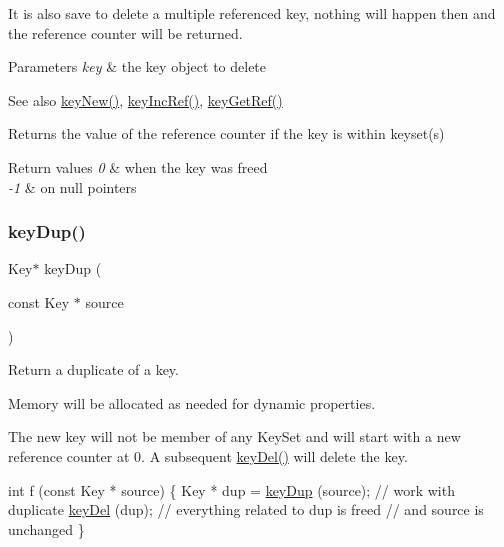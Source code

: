 It is also save to delete a multiple referenced key, nothing will happen then and the reference counter will be returned.


\begin{DoxyParams}{Parameters}
{\em key} & the key object to delete \\
\hline
\end{DoxyParams}
\begin{DoxySeeAlso}{See also}
\hyperlink{group__key_gad23c65b44bf48d773759e1f9a4d43b89}{key\+New()}, \hyperlink{group__key_ga6970a6f254d67af7e39f8e469bb162f1}{key\+Inc\+Ref()}, \hyperlink{group__key_ga4aabc4272506dd63161db2bbb42de8ae}{key\+Get\+Ref()} 
\end{DoxySeeAlso}
\begin{DoxyReturn}{Returns}
the value of the reference counter if the key is within keyset(s) 
\end{DoxyReturn}

\begin{DoxyRetVals}{Return values}
{\em 0} & when the key was freed \\
\hline
{\em -\/1} & on null pointers \\
\hline
\end{DoxyRetVals}
\mbox{\label{group__key_gae6ec6a60cc4b8c1463fa08623d056ce3}} 
\subsubsection{\texorpdfstring{key\+Dup()}{keyDup()}}
{\footnotesize\ttfamily Key$\ast$ key\+Dup (\begin{DoxyParamCaption}\item[{const Key $\ast$}]{source }\end{DoxyParamCaption})}



Return a duplicate of a key. 

Memory will be allocated as needed for dynamic properties.

The new key will not be member of any Key\+Set and will start with a new reference counter at 0. A subsequent \hyperlink{group__key_ga3df95bbc2494e3e6703ece5639be5bb1}{key\+Del()} will delete the key.


\begin{DoxyCode}
\textcolor{keywordtype}{int} f (\textcolor{keyword}{const} Key * source)
\{
        Key * dup = \hyperlink{group__key_gae6ec6a60cc4b8c1463fa08623d056ce3}{keyDup} (source);
        \textcolor{comment}{// work with duplicate}
        \hyperlink{group__key_ga3df95bbc2494e3e6703ece5639be5bb1}{keyDel} (dup);
        \textcolor{comment}{// everything related to dup is freed}
        \textcolor{comment}{// and source is unchanged}
\}
\end{DoxyCode}


